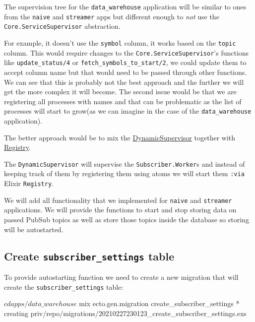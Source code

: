\documentclass[
  oneside]{book}
\newenvironment{Shaded}{\begin{snugshade}}{\end{snugshade}}
\newcommand{\ExtensionTok}[1]{#1}
\newcommand{\NormalTok}[1]{#1}
\begin{document}
The supervision tree for the \texttt{data\_warehouse} application will be similar to ones from the \texttt{naive} and \texttt{streamer} apps but different enough to \emph{not} use the \texttt{Core.ServiceSupervisor} abstraction.

For example, it doesn't use the \texttt{symbol} column, it works based on the \texttt{topic} column. This would require changes to the \texttt{Core.ServiceSupervisor}'s functions like \texttt{update\_status/4} or \texttt{fetch\_symbols\_to\_start/2}, we could update them to accept column name but that would need to be passed through other functions. We can see that this is probably not the best approach and the further we will get the more complex it will become. The second issue would be that we are registering all processes with names and that can be problematic as the list of processes will start to grow(as we can imagine in the case of the \texttt{data\_warehouse} application).

The better approach would be to mix the \href{https://hexdocs.pm/elixir/master/DynamicSupervisor.html}{DynamicSupervisor} together with \href{https://hexdocs.pm/elixir/master/Registry.html}{Registry}.

The \texttt{DynamicSupervisor} will supervise the \texttt{Subscriber.Worker}s and instead of keeping track of them by registering them using atoms we will start them \texttt{:via} Elixir \texttt{Registry}.

We will add all functionality that we implemented for \texttt{naive} and \texttt{streamer} applications. We will provide the functions to start and stop storing data on passed PubSub topics as well as store those topics inside the database so storing will be autostarted.

\subsection{\texorpdfstring{Create \texttt{subscriber\_settings} table}{Create subscriber\_settings table}}\label{create-subscriber_settings-table}

To provide autostarting function we need to create a new migration that will create the \texttt{subscriber\_settings} table:

\begin{Shaded}
\begin{Highlighting}[]
\ExtensionTok{$}\NormalTok{ cd apps/data\_warehouse}
\ExtensionTok{$}\NormalTok{ mix ecto.gen.migration create\_subscriber\_settings}
\ExtensionTok{*}\NormalTok{ creating priv/repo/migrations/20210227230123\_create\_subscriber\_settings.exs}
\end{Highlighting}
\end{Shaded}
\end{document}
